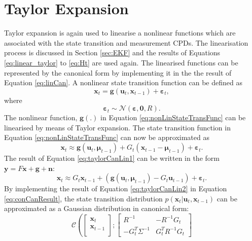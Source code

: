 \documentclass[12pt,oneside,openany,a4paper, %
afrikaans,english,
]{memoir}
\numberwithin{equation}{chapter}
\begin{document}
{\section{Taylor Expansion}
Taylor expansion is again used to linearise a nonlinear functions which are associated with the state transition and measurement CPDs. The linearisation process is discussed in Section \ref{sec:EKF} and the results of Equations \ref{eq:linear_taylor} to \ref{eq:Ht} are used again.
The linearised functions can be represented by the canonical form by implementing it in the the result of Equation \ref{eq:linCan}. A nonlinear state transition function can be defined as
\begin{equation}\label{eq:nonLinStateTransFunc}
\bm{x}_t = \bm{g}(\bm{u}_t, \bm{x}_{t-1}) + \bm{\varepsilon}_t,
\end{equation}
where
\begin{equation}
\bm{\varepsilon}_t \sim \mathcal{N}(\bm{\varepsilon}, \bm{0}, R).
\end{equation}
The nonlinear function, $\bm{g}(.)$ in Equation \ref{eq:nonLinStateTransFunc} can be linearised by means of Taylor expansion. The state transition function in Equation \ref{eq:nonLinStateTransFunc} can now be approximated as
\begin{equation}\label{eq:taylorCanLin1}
\bm{x}_t \approx \bm{g}(\bm{u}_t, \bm{\mu}_{t-1}) + G_t(\bm{x}_{t-1} - 
\bm{\mu}_{t-1}) + \bm{\varepsilon}_t.
\end{equation}
The result of Equation \ref{eq:taylorCanLin1} can be written in the form $\bm{y} = F\bm{x} + \bm{g} + \bm{n}$:
\begin{equation}\label{eq:taylorCanLin2}
\bm{x}_t \approx G_t\bm{x}_{t-1} + (\bm{g}(\bm{u}_t, \bm{\mu}_{t-1}) - G_t\bm{u}_{t-1}) + \bm{\varepsilon}_t.
\end{equation}
By implementing the result of Equation \ref{eq:taylorCanLin2} in Equation \ref{eq:conCanResult}, the state transition distribution $p(\bm{x}_t|\bm{u}_t,\bm{x}_{t-1})$ can be approximated as a Gaussian distribution in canonical form: 
\begin{equation}
\mathcal{C}\left(
\begin{bmatrix}
\bm{x}_t \\
\bm{x}_{t-1} \\
\end{bmatrix};
\begin{bmatrix}
R^{-1}  &  -R^{-1}G_t\\
-G_t^T\Sigma^{-1} & G_t^T R^{-1}G_t
\end{bmatrix}

\end{equation}}
\end{document}
